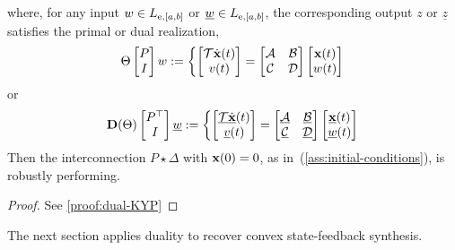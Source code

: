 \begin{corollary}
    where, for any input $w\in L_{{\mathrm{e}},[a,b]}$ or
    $\underline w\in L_{{\mathrm{e}},[a,b]}$, the corresponding output
    $z$ or $\underline z$ satisfies the primal or dual realization,
    \begin{equation*}
        \Theta\begin{bmatrix}P\\I\end{bmatrix}w := \left\{ \begin{bmatrix}\mathcal{T} \dot{\mathbf{x}}(t) \\ v(t)\end{bmatrix} = \begin{bmatrix}\mathcal{A} & \mathcal{B}\\
        \mathcal{C} & \mathcal{D}\end{bmatrix}\begin{bmatrix}\mathbf{x}(t) \\ w(t)\end{bmatrix}\right.
    \end{equation*}
    or
    \begin{equation}\label{eq:dual-system}
        \mathbf{D}(\Theta)\begin{bmatrix}P^\top\\I\end{bmatrix}\underline{w} := \left\{ \begin{bmatrix}\underline{\mathcal{T}} \dot{\underline{\mathbf{x}}}(t) \\ {\underline{v}}(t)\end{bmatrix} = \begin{bmatrix}\underline{\mathcal{A}} & \underline{\mathcal{B}}\\
        \underline{\mathcal{C}} & \underline{\mathcal{D}}\end{bmatrix}\begin{bmatrix}\underline{\mathbf{x}}(t) \\ \underline{w}(t)\end{bmatrix}\right.
    \end{equation}
    Then the interconnection $P\star\Delta$ with $\mathbf{x}(0) = 0$, as
    in~(\ref{ass:initial-conditions}), is robustly performing.
\end{corollary}
\begin{proof}
    See \ref{proof:dual-KYP}
\end{proof}
The next section applies duality to recover convex state-feedback synthesis.
